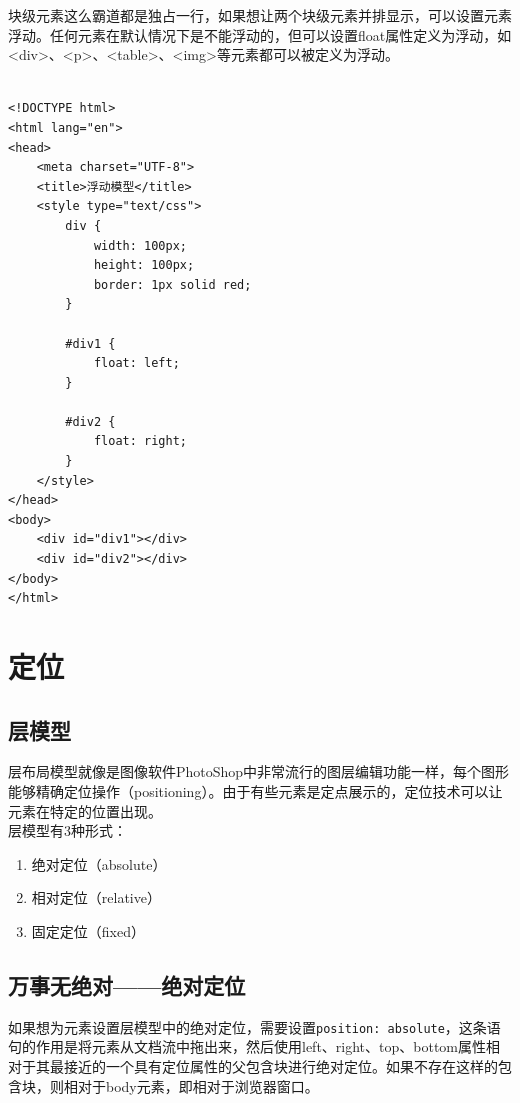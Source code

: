 块级元素这么霸道都是独占一行，如果想让两个块级元素并排显示，可以设置元素浮动。任何元素在默认情况下是不能浮动的，但可以设置float属性定义为浮动，如<div>、<p>、<table>、<img>等元素都可以被定义为浮动。 \\

 \\

\begin{lstlisting}[style=htmlcssjs]
<!DOCTYPE html>
<html lang="en">
<head>
    <meta charset="UTF-8">
    <title>浮动模型</title>
    <style type="text/css">
        div {
            width: 100px;
            height: 100px;
            border: 1px solid red;
        }

        #div1 {
            float: left;
        }

        #div2 {
            float: right;
        }
    </style>
</head>
<body>
    <div id="div1"></div>
    <div id="div2"></div>
</body>
</html>
\end{lstlisting}

\newpage

\section{定位}

\subsection{层模型}

层布局模型就像是图像软件PhotoShop中非常流行的图层编辑功能一样，每个图形能够精确定位操作（positioning）。由于有些元素是定点展示的，定位技术可以让元素在特定的位置出现。 \\

层模型有3种形式：

\begin{enumerate}
	\item 绝对定位（absolute）
	\item 相对定位（relative）
	\item 固定定位（fixed）
\end{enumerate}

\subsection{万事无绝对——绝对定位}

如果想为元素设置层模型中的绝对定位，需要设置\lstinline|position: absolute|，这条语句的作用是将元素从文档流中拖出来，然后使用left、right、top、bottom属性相对于其最接近的一个具有定位属性的父包含块进行绝对定位。如果不存在这样的包含块，则相对于body元素，即相对于浏览器窗口。 \\

